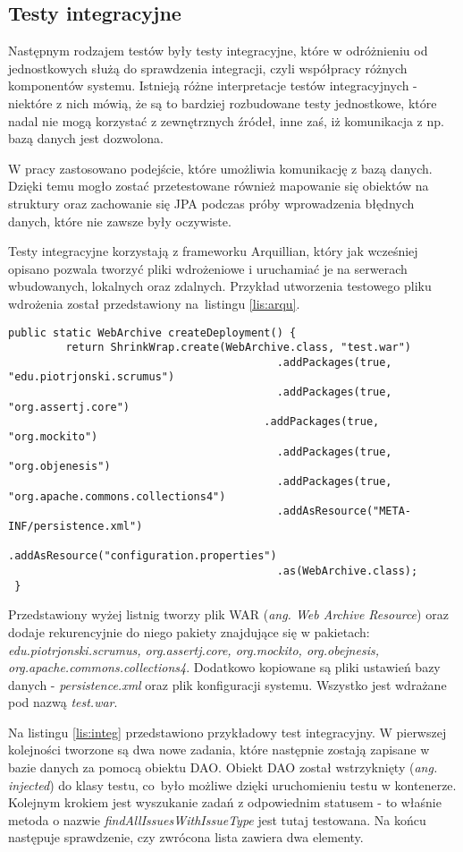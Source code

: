 \subsection{Testy integracyjne}
Następnym rodzajem testów były testy integracyjne, które w odróżnieniu od jednostkowych służą do sprawdzenia integracji, czyli współpracy różnych komponentów systemu. Istnieją różne interpretacje testów integracyjnych - niektóre z nich mówią, że są to bardziej rozbudowane testy jednostkowe, które nadal nie mogą korzystać z zewnętrznych źródeł, inne zaś, iż komunikacja z np. bazą danych jest dozwolona. 

W pracy zastosowano podejście, które umożliwia komunikację z bazą danych. Dzięki temu mogło zostać przetestowane również mapowanie się obiektów na struktury oraz zachowanie się JPA podczas próby wprowadzenia błędnych danych, które nie zawsze były oczywiste.

Testy integracyjne korzystają z frameworku Arquillian, który jak wcześniej opisano pozwala tworzyć pliki wdrożeniowe i uruchamiać je na serwerach wbudowanych, lokalnych oraz zdalnych. Przykład utworzenia testowego pliku wdrożenia został przedstawiony na~listingu \ref{lis:arqu}.

\begin{lstlisting}[caption={Przykład przygotowania pliku wdrożenia Arquillian}, label=lis:arqu, numbers=none]
 public static WebArchive createDeployment() {
		 return ShrinkWrap.create(WebArchive.class, "test.war")
										  .addPackages(true, "edu.piotrjonski.scrumus")
										  .addPackages(true, "org.assertj.core")
									   	.addPackages(true, "org.mockito")
										  .addPackages(true, "org.objenesis")
										  .addPackages(true, "org.apache.commons.collections4")
										  .addAsResource("META-INF/persistence.xml")
										  .addAsResource("configuration.properties")
										  .as(WebArchive.class);
 }\end{lstlisting}

Przedstawiony wyżej listnig tworzy plik WAR (\textit{ang. Web Archive Resource}) oraz dodaje rekurencyjnie do niego pakiety znajdujące się w pakietach: \textit{edu.piotrjonski.scrumus, org.assertj.core, org.mockito, org.obejnesis, org.apache.commons.collections4}. Dodatkowo kopiowane są pliki ustawień bazy danych - \textit{persistence.xml} oraz plik konfiguracji systemu. Wszystko jest wdrażane pod nazwą \textit{test.war}.

Na listingu \ref{lis:integ} przedstawiono przykładowy test integracyjny. W pierwszej kolejności tworzone są dwa nowe zadania, które następnie zostają zapisane w bazie danych za pomocą obiektu DAO. Obiekt DAO został wstrzyknięty (\textit{ang. injected}) do klasy testu, co~było możliwe dzięki uruchomieniu testu w kontenerze. Kolejnym krokiem jest wyszukanie zadań z odpowiednim statusem - to właśnie metoda o nazwie \textit{findAllIssuesWithIssueType} jest tutaj testowana. Na końcu następuje sprawdzenie, czy zwrócona lista zawiera dwa elementy.

